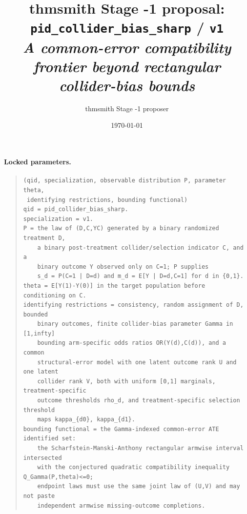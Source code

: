 \documentclass[11pt]{article}
\title{thmsmith Stage -1 proposal: \texttt{pid\_collider\_bias\_sharp} / \texttt{v1}%
  \\ \large\textit{A common-error compatibility frontier beyond rectangular collider-bias bounds}}
\author{thmsmith Stage -1 proposer}
\date{\today}
\theoremstyle{definition}
\theoremstyle{plain}
\theoremstyle{remark}
\begin{document}
\maketitle


\paragraph{Locked parameters.}
\begin{quote}
\begin{verbatim}
(qid, specialization, observable distribution P, parameter theta,
 identifying restrictions, bounding functional)
qid = pid_collider_bias_sharp.
specialization = v1.
P = the law of (D,C,YC) generated by a binary randomized treatment D,
    a binary post-treatment collider/selection indicator C, and a
    binary outcome Y observed only on C=1; P supplies
    s_d = P(C=1 | D=d) and m_d = E[Y | D=d,C=1] for d in {0,1}.
theta = E[Y(1)-Y(0)] in the target population before conditioning on C.
identifying restrictions = consistency, random assignment of D, bounded
    binary outcomes, finite collider-bias parameter Gamma in [1,infty]
    bounding arm-specific odds ratios OR(Y(d),C(d)), and a common
    structural-error model with one latent outcome rank U and one latent
    collider rank V, both with uniform [0,1] marginals, treatment-specific
    outcome thresholds rho_d, and treatment-specific selection threshold
    maps kappa_{d0}, kappa_{d1}.
bounding functional = the Gamma-indexed common-error ATE identified set:
    the Scharfstein-Manski-Anthony rectangular armwise interval intersected
    with the conjectured quadratic compatibility inequality Q_Gamma(P,theta)<=0;
    endpoint laws must use the same joint law of (U,V) and may not paste
    independent armwise missing-outcome completions.
\end{verbatim}
\end{quote}
\end{document}
